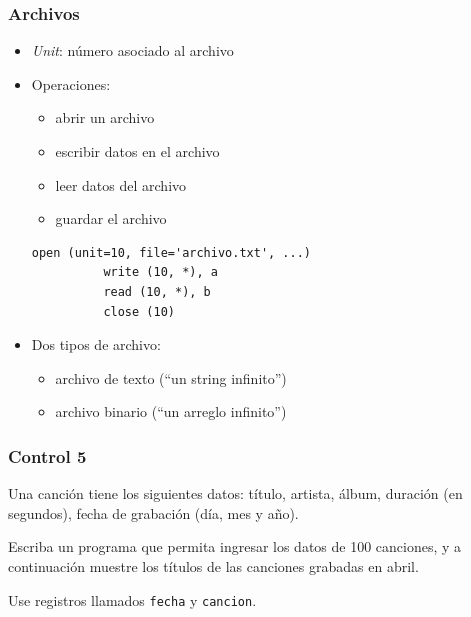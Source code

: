 \documentclass[12pt]{beamer}
\begin{document}
  \begin{frame}[fragile]
    \frametitle{Archivos}
    \begin{itemize}
      \item \emph{Unit}: número asociado al archivo
      \item Operaciones:
        \begin{itemize}
          \item abrir un archivo
          \item escribir datos en el archivo
          \item leer datos del archivo
          \item guardar el archivo
        \end{itemize}
        \pause
        \begin{lstlisting}[frame=single,gobble=6]
          open (unit=10, file='archivo.txt', ...)
          write (10, *), a
          read (10, *), b
          close (10)
        \end{lstlisting}
        \pause
      \item Dos tipos de archivo:
        \begin{itemize}
          \item archivo de texto (``un string infinito'')
          \item archivo binario (``un arreglo infinito'')
        \end{itemize}

    \end{itemize}
    
\end{frame}

  \begin{frame}
      \frametitle{Control 5}
      \pause

      Una canción tiene los siguientes datos: título, artista, álbum,
      duración (en segundos), fecha de grabación (día, mes y año).

      Escriba un programa que permita ingresar los datos de 100 canciones,
      y a continuación
      muestre los títulos de las canciones grabadas en abril. 

      Use registros llamados \texttt{fecha} y \texttt{cancion}.
  \end{frame}
\end{document}
